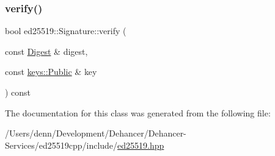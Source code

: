 \subsubsection{\texorpdfstring{verify()}{verify()}\hspace{0.1cm}{\footnotesize\ttfamily [3/3]}}
{\footnotesize\ttfamily bool ed25519\+::\+Signature\+::verify (\begin{DoxyParamCaption}\item[{const \mbox{\hyperlink{structed25519_1_1_digest}{Digest}} \&}]{digest,  }\item[{const \mbox{\hyperlink{classed25519_1_1keys_1_1_public}{keys\+::\+Public}} \&}]{key }\end{DoxyParamCaption}) const}



The documentation for this class was generated from the following file\+:\begin{DoxyCompactItemize}
\item 
/\+Users/denn/\+Development/\+Dehancer/\+Dehancer-\/\+Services/ed25519cpp/include/\mbox{\hyperlink{ed25519_8hpp}{ed25519.\+hpp}}\end{DoxyCompactItemize}
